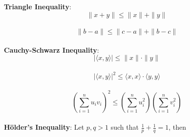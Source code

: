 
{\footnotesize
\begin{theorem}[]{}
    \textbf{Triangle Inequality}:
    \vspace{-5pt}\\
    \begin{equation*}
        \|{x + y}\| \leq \|{x}\| + \|{y}\|
    \end{equation*}
    \vspace{-15pt}\\
    \begin{equation*}
        \|{b - a}\| \leq \|{c-a}\| + \|{b-c}\|
    \end{equation*}
    \vspace{-5pt}\\
    \textbf{Cauchy-Schwarz Inequality}:
    {
    \vspace{-5pt}\\
    \begin{equation*}
        |{\langle x, y \rangle}| \leq \|x\| \cdot \|y\|
    \end{equation*}
    \vspace{-12pt}\\
    \begin{equation*}
        |{\langle x, y \rangle}|^2 \leq \langle x, x \rangle \cdot \langle y, y \rangle
    \end{equation*}
    \vspace{-12pt}\\
    \begin{equation*}
        \left(\sum_{i=1}^{n}u_iv_i\right)^2 \leq \left(\sum_{i=1}^{n}u_i^2\right)\left(\sum_{i=1}^{n}v_i^2\right)
    \end{equation*}
    \vspace{-5pt}\\
    }
    \textbf{H\"older's Inequality}:
    Let $p, q > 1$ such that $\frac{1}{p} + \frac{1}{q} = 1$, then

\end{theorem}}
